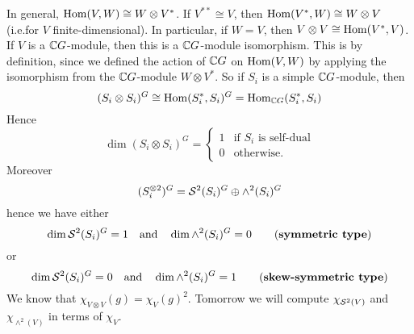 In general, $\operatorname{Hom}(V,W) \cong W \otimes V^*$.
If $V^{**} \cong V$, then $\operatorname{Hom}(V^*,W) \cong W \otimes V$ (i.e.\@ for $V$ finite-dimensional).
In particular, if $W=V$, then $V \otimes V \cong \operatorname{Hom}(V^*,V)$.
If $V$ is a $\mathbb{C} G$-module, then this is a $\mathbb{C} G$-module isomorphism.
This is by definition, since we defined the action of $\mathbb{C} G$ on $\operatorname{Hom}(V,W)$ by applying the isomorphism from the $\mathbb{C} G$-module $W \otimes V^*$.
So if $S_i$ is a simple $\mathbb{C} G$-module, then
\[ (S_i \otimes S_i)^G \cong \operatorname{Hom}(S_i^*,S_i)^G = \operatorname{Hom}_{\mathbb{C} G}(S_i^*,S_i) \]
Hence
\[ \dim(S_i \otimes S_i)^G=
  \begin{cases}
    1 &\text{if $S_i$ is self-dual} \\
    0 &\text{otherwise.}
  \end{cases}
\]
Moreover
\[ (S_i^{\otimes 2})^G = \mathcal{S}^2(S_i)^G \oplus \wedge^2(S_i)^G \]
hence we have either
\[ \dim\mathcal{S}^2(S_i)^G = 1 \quad\text{and}\quad \dim\wedge^2(S_i)^G = 0 \qquad\text{(\textbf{symmetric type})} \]
or
\[ \dim\mathcal{S}^2(S_i)^G = 0 \quad\text{and}\quad \dim\wedge^2(S_i)^G = 1 \qquad\text{(\textbf{skew-symmetric type})} \]
We know that $\chi_{V \otimes V}(g) = \chi_V(g)^2$.
Tomorrow we will compute $\chi_{\mathcal{S}^2(V)}$ and $\chi_{\wedge^2(V)}$ in terms of $\chi_V$.

